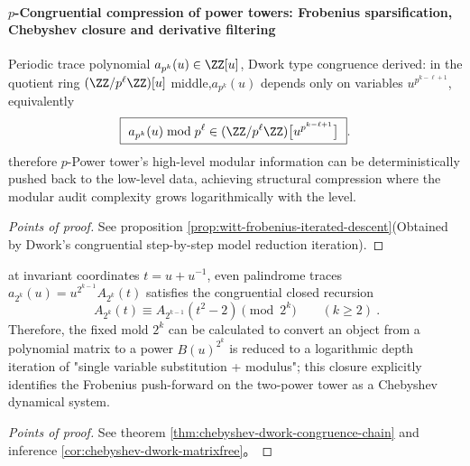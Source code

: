 \paragraph{\texorpdfstring{$p$}{p}-Congruential compression of power towers: Frobenius sparsification, Chebyshev closure and derivative filtering}

\begin{conclusion}\label{con:xi-witt-frobenius-sparsification-universal}
Periodic trace polynomial \(a_{p^k}(u)\in\ZZ[u]\), Dwork type congruence derived: in the quotient ring \((\ZZ/p^\ell\ZZ)[u]\) middle,\(a_{p^k}(u)\) depends only on variables \(u^{p^{k-\ell+1}}\), equivalently
\[
\boxed{\ a_{p^k}(u)\bmod p^\ell\in(\ZZ/p^\ell\ZZ)\bigl[u^{p^{k-\ell+1}}\bigr]\ }.
\]
therefore \(p\)-Power tower's high-level modular information can be deterministically pushed back to the low-level data, achieving structural compression where the modular audit complexity grows logarithmically with the level.
\end{conclusion}
\begin{proof}[Points of proof]
See proposition \ref{prop:witt-frobenius-iterated-descent}(Obtained by Dwork’s congruential step-by-step model reduction iteration).
\end{proof}

\begin{conclusion}[\texorpdfstring{$p=2$}{p=2} Chebyshev--Dwork closure: matrix power congruential recursive dimensionality reduction into single variable substitution \texorpdfstring{$t\mapsto t^2-2$}{t->t^2-2}]\label{con:xi-chebyshev-dwork-closure-p2}
at invariant coordinates \(t=u+u^{-1}\), even palindrome traces \(a_{2^k}(u)=u^{2^{k-1}}A_{2^k}(t)\) satisfies the congruential closed recursion
\[
\boxed{\ A_{2^k}(t)\equiv A_{2^{k-1}}(t^2-2)\pmod{2^k}\qquad(k\ge 2)\ }.
\]
Therefore, the fixed mold \(2^k\) can be calculated to convert an object from a polynomial matrix to a power \(B(u)^{2^k}\) is reduced to a logarithmic depth iteration of "single variable substitution + modulus"; this closure explicitly identifies the Frobenius push-forward on the two-power tower as a Chebyshev dynamical system.
\end{conclusion}
\begin{proof}[Points of proof]
See theorem \ref{thm:chebyshev-dwork-congruence-chain} and inference \ref{cor:chebyshev-dwork-matrixfree}。
\end{proof}

